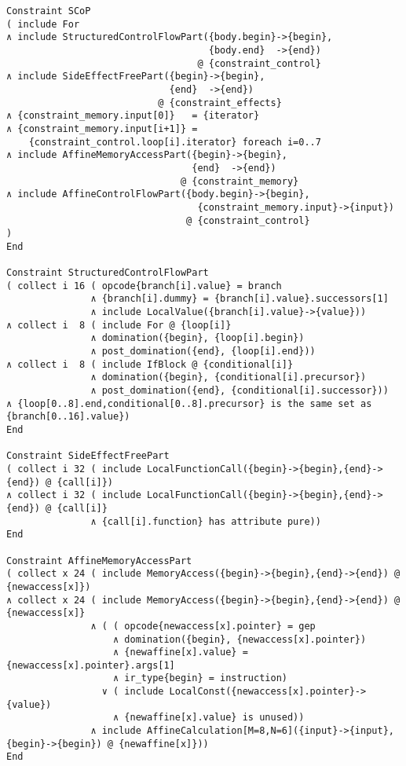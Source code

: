 \begin{lstlisting}[language=CAnDL]
Constraint SCoP
( include For
∧ include StructuredControlFlowPart({body.begin}->{begin},
                                    {body.end}  ->{end})
                                  @ {constraint_control}
∧ include SideEffectFreePart({begin}->{begin},
                             {end}  ->{end})
                           @ {constraint_effects}
∧ {constraint_memory.input[0]}   = {iterator}
∧ {constraint_memory.input[i+1]} =
    {constraint_control.loop[i].iterator} foreach i=0..7
∧ include AffineMemoryAccessPart({begin}->{begin},
                                 {end}  ->{end})
                               @ {constraint_memory}
∧ include AffineControlFlowPart({body.begin}->{begin},
                                  {constraint_memory.input}->{input})
                                @ {constraint_control}
)
End

Constraint StructuredControlFlowPart
( collect i 16 ( opcode{branch[i].value} = branch
               ∧ {branch[i].dummy} = {branch[i].value}.successors[1]
               ∧ include LocalValue({branch[i].value}->{value}))
∧ collect i  8 ( include For @ {loop[i]}
               ∧ domination({begin}, {loop[i].begin})
               ∧ post_domination({end}, {loop[i].end}))
∧ collect i  8 ( include IfBlock @ {conditional[i]}
               ∧ domination({begin}, {conditional[i].precursor})
               ∧ post_domination({end}, {conditional[i].successor}))
∧ {loop[0..8].end,conditional[0..8].precursor} is the same set as {branch[0..16].value})
End

Constraint SideEffectFreePart
( collect i 32 ( include LocalFunctionCall({begin}->{begin},{end}->{end}) @ {call[i]}) 
∧ collect i 32 ( include LocalFunctionCall({begin}->{begin},{end}->{end}) @ {call[i]}
               ∧ {call[i].function} has attribute pure))
End

Constraint AffineMemoryAccessPart
( collect x 24 ( include MemoryAccess({begin}->{begin},{end}->{end}) @ {newaccess[x]})
∧ collect x 24 ( include MemoryAccess({begin}->{begin},{end}->{end}) @ {newaccess[x]}
               ∧ ( ( opcode{newaccess[x].pointer} = gep
                   ∧ domination({begin}, {newaccess[x].pointer})
                   ∧ {newaffine[x].value} = {newaccess[x].pointer}.args[1]
                   ∧ ir_type{begin} = instruction)
                 ∨ ( include LocalConst({newaccess[x].pointer}->{value})
                   ∧ {newaffine[x].value} is unused))
               ∧ include AffineCalculation[M=8,N=6]({input}->{input},{begin}->{begin}) @ {newaffine[x]}))
End


\end{lstlisting}
